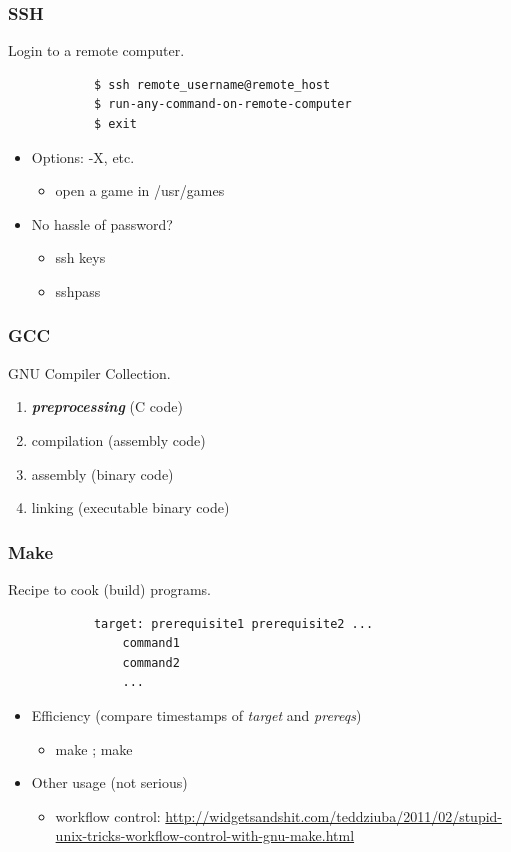 \documentclass{beamer}
\begin{document}
	\begin{frame}[fragile]
		\frametitle{SSH}
		Login to a remote computer.
		\begin{center}
		\begin{verbatim}
			$ ssh remote_username@remote_host
			$ run-any-command-on-remote-computer
			$ exit
    \end{verbatim}
		\end{center}
		\begin{itemize}
      \item Options: -X, etc.
			\begin{itemize}
        \item open a game in /usr/games
      \end{itemize}
			\item No hassle of password? \\
			\begin{itemize}
				\item ssh keys
				\item sshpass
			\end{itemize}	
		\end{itemize}
	\end{frame}

  \begin{frame}
    \frametitle{GCC}
    GNU Compiler Collection.

		\begin{enumerate}
      \item \textbf{\textit{preprocessing}} (C code) 
      \item compilation (assembly code)
			\item assembly (binary code)
			\item linking (executable binary code)
    \end{enumerate}
  \end{frame}

  \begin{frame}[fragile]
    \frametitle{Make}
    Recipe to cook (build) programs. 
    \begin{verbatim}
			target: prerequisite1 prerequisite2 ...
			    command1
			    command2
			    ...
    \end{verbatim}
		\begin{itemize}
      \item Efficiency (compare timestamps of \textit{target} and \textit{prereqs})
			\begin{itemize}
        \item make ; make
      \end{itemize}
			\item Other usage (not serious)
			\begin{itemize}
        \item workflow control: \textcolor{ExecusharesGrey}{\footnotesize\hspace{1em}\url{http://widgetsandshit.com/teddziuba/2011/02/stupid-unix-tricks-workflow-control-with-gnu-make.html}}
      \end{itemize}						 
    \end{itemize}	
	\end{frame}
\end{document}
